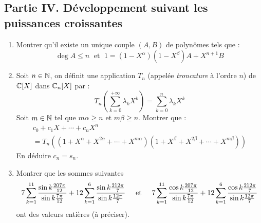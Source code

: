 \subsection*{Partie IV. Développement suivant les puissances croissantes}
\begin{enumerate}
 \item Montrer qu'il existe un unique couple $(A,B)$ de polynômes tels que :
\begin{displaymath}
  \deg A \leq n \; \text{ et } \;  1 = (1-X^\alpha)(1-X^\beta)A + X^{n+1}B 
\end{displaymath}
\item Soit $n\in \mathbb{N}$, on définit une application $T_n$ (appelée \emph{troncature} à l'ordre $n$) de $\mathbb{C}[X]$ dans $\mathbb{C}_n[X]$ par :
\begin{displaymath}
 T_n\left(\sum _{k=0}^{+\infty} \lambda_k X^k \right) = \sum _{k=0}^{n} \lambda_k X^k  
\end{displaymath}
Soit $m\in \mathbb{N}$ tel que $m\alpha\geq n$ et $m\beta\geq n$. Montrer que :
\begin{multline*}
 c_0 + c_1 X + \cdots + c_n X^n \\
 = T_n\left( (1+X^\alpha + X^{2\alpha}+\cdots+X^{m\alpha})(1+X^\beta + X^{2\beta}+\cdots+X^{m\beta})\right) 
\end{multline*}
En déduire $c_n=s_n$.
\item Montrer que les sommes suivantes 
\begin{displaymath}
 7\sum_{k=1}^{11}\frac{\sin k\frac{207\pi}{12}}{\sin k\frac{7\pi}{12}} +
 12\sum_{k=1}^{6}\frac{\sin k\frac{212\pi}{7}}{\sin k\frac{12\pi}{7}}
 \hspace{0.5cm} \text{et} \hspace{0.5cm} 
 7\sum_{k=1}^{11}\frac{\cos k\frac{207\pi}{12}}{\sin k\frac{7\pi}{12}} +
 12\sum_{k=1}^{6}\frac{\cos k\frac{212\pi}{7}}{\sin k\frac{12\pi}{7}} 
\end{displaymath}
ont des valeurs entières (à préciser).
\end{enumerate}
